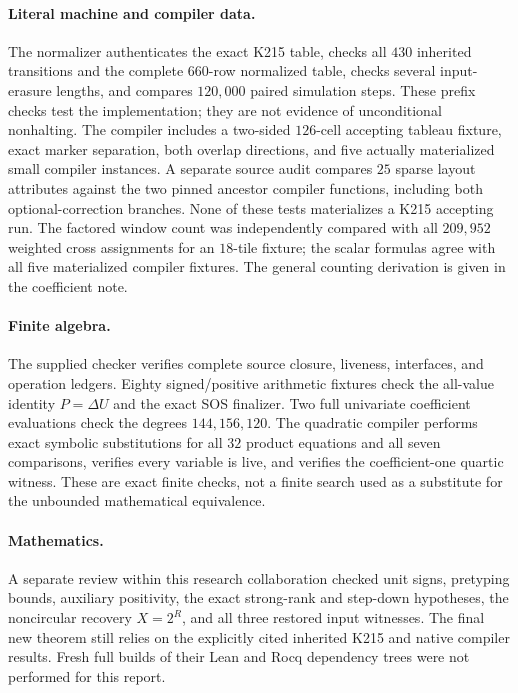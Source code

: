 \documentclass[11pt]{article}
\theoremstyle{remark}\newtheorem{remark}[theorem]{Remark}
\begin{document}
\paragraph{Literal machine and compiler data.}
The normalizer authenticates the exact K215 table, checks all
$430$ inherited transitions and the complete $660$-row normalized
table, checks several input-erasure lengths, and compares $120{,}000$
paired simulation steps. These prefix checks test the implementation;
they are not evidence of unconditional nonhalting. The compiler
includes a two-sided $126$-cell accepting tableau fixture, exact
marker separation, both overlap directions, and five actually
materialized small compiler instances. A separate source audit
compares $25$ sparse layout attributes against the two pinned
ancestor compiler functions, including both optional-correction
branches. None of these tests materializes a K215 accepting run.
The factored window count was independently compared with all
$209{,}952$ weighted cross assignments for an $18$-tile fixture;
the scalar formulas agree with all five materialized compiler
fixtures. The general counting derivation is given in the coefficient note.

\paragraph{Finite algebra.}
The supplied checker verifies complete source closure, liveness,
interfaces, and operation ledgers. Eighty signed/positive arithmetic
fixtures check the all-value identity $P=\Delta U$ and the exact
SOS finalizer. Two full univariate coefficient evaluations check
the degrees $144,156,120$. The quadratic compiler performs exact
symbolic substitutions for all $32$ product equations and all
seven comparisons, verifies every variable is live, and verifies
the coefficient-one quartic witness. These are exact finite
checks, not a finite search used as a substitute for the
unbounded mathematical equivalence.

\paragraph{Mathematics.}
A separate review within this research collaboration checked unit signs, pretyping bounds,
auxiliary positivity, the exact strong-rank and step-down
hypotheses, the noncircular recovery $X=2^R$, and all three
restored input witnesses. The final new theorem still relies on
the explicitly cited inherited K215 and native compiler results.
Fresh full builds of their Lean and Rocq dependency trees were
not performed for this report.
\end{document}

